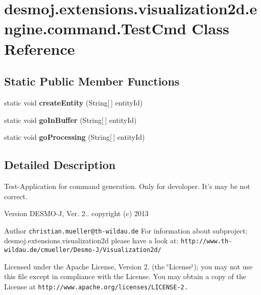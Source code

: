 \section{desmoj.\-extensions.\-visualization2d.\-engine.\-command.\-Test\-Cmd Class Reference}
\label{classdesmoj_1_1extensions_1_1visualization2d_1_1engine_1_1command_1_1_test_cmd}
\subsection*{Static Public Member Functions}
\begin{DoxyCompactItemize}
\item 
static void {\bfseries create\-Entity} (String[$\,$] entity\-Id)\label{classdesmoj_1_1extensions_1_1visualization2d_1_1engine_1_1command_1_1_test_cmd_a8e4e13931b54a8ad51f27686dcb7890a}

\item 
static void {\bfseries go\-In\-Buffer} (String[$\,$] entity\-Id)\label{classdesmoj_1_1extensions_1_1visualization2d_1_1engine_1_1command_1_1_test_cmd_a8187c67164cdd3a73191cdf029604791}

\item 
static void {\bfseries go\-Processing} (String[$\,$] entity\-Id)\label{classdesmoj_1_1extensions_1_1visualization2d_1_1engine_1_1command_1_1_test_cmd_a8821a9fe3ab5d3c456e763d60d90e32c}

\end{DoxyCompactItemize}


\subsection{Detailed Description}
Test-\/\-Application for command generation. Only for devoloper. It's may be not correct.

\begin{DoxyVersion}{Version}
D\-E\-S\-M\-O-\/\-J, Ver. 2.. copyright (c) 2013 
\end{DoxyVersion}
\begin{DoxyAuthor}{Author}
{\tt christian.\-mueller@th-\/wildau.\-de} For information about subproject\-: desmoj.\-extensions.\-visualization2d please have a look at\-: {\tt http\-://www.\-th-\/wildau.\-de/cmueller/\-Desmo-\/\-J/\-Visualization2d/}
\end{DoxyAuthor}
Licensed under the Apache License, Version 2. (the \char`\"{}\-License\char`\"{}); you may not use this file except in compliance with the License. You may obtain a copy of the License at {\tt http\-://www.\-apache.\-org/licenses/\-L\-I\-C\-E\-N\-S\-E-\/2.}


